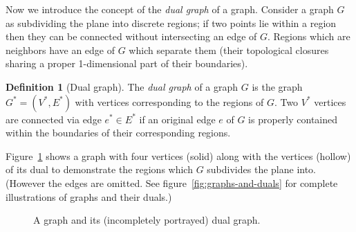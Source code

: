 \documentclass{amsart}
\theoremstyle{plain}
\theoremstyle{remark}
\theoremstyle{definition}
\newtheorem*{definition}{Definition}
\begin{document}
Now we introduce the concept of the \emph{dual graph} of a graph. Consider a
graph $G$ as subdividing the plane into discrete regions; if two points lie
within a region then they can be connected without intersecting an edge of $G$.
Regions which are neighbors have an edge of $G$ which separate them
(their topological closures sharing a proper 1-dimensional part of their
boundaries).
\begin{definition}[Dual graph]
  The \emph{dual graph} of a graph $G$ is the graph $G^*=(V^*,E^*)$ with
  vertices corresponding to the regions of $G$.
  Two $V^*$ vertices are connected via edge $e^*\in E^*$ if an original edge $e$
  of $G$ is properly contained within the boundaries of their corresponding
  regions.
\end{definition}
Figure~\ref{fig:dual-incomplete} shows a graph with four vertices (solid)
along with the vertices (hollow) of its dual to demonstrate the regions which
$G$ subdivides the plane into.
(However the edges are omitted.
See figure~\ref{fig:graphs-and-duals} for complete illustrations of graphs and
their duals.)
\begin{figure}[h]
  \caption{A graph and its (incompletely portrayed) dual graph.}
  \label{fig:dual-incomplete}
\end{figure}
\end{document}
